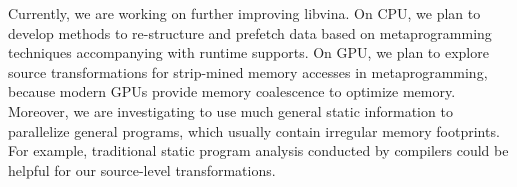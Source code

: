 
Currently, we are working on further improving libvina.
On CPU, we plan to develop methods to re-structure and
prefetch data based on metaprogramming techniques accompanying with runtime
supports. On GPU, we plan to explore source
transformations for strip-mined memory accesses in metaprogramming,
because modern GPUs provide memory coalescence to optimize memory. 
Moreover,  we are investigating to use much general static information
to parallelize general programs, which usually contain irregular memory
footprints. For example, traditional static program analysis
conducted by compilers could be helpful for our source-level transformations.





